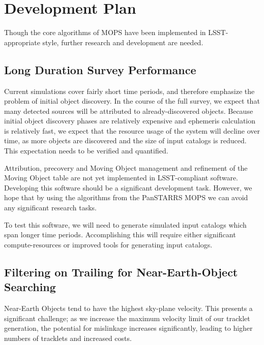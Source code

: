 \documentclass[12pt,preprint]{aastex}
\begin{document}
\section{Development Plan}

Though the core algorithms of MOPS have been implemented in
LSST-appropriate style, further research and development are needed.



\subsection{Long Duration Survey Performance}

Current simulations cover fairly short time periods, and therefore
emphasize the problem of initial object discovery.  In the course of
the full survey, we expect that many detected sources will be
attributed to already-discovered objects.  Because initial object
discovery phases are relatively expensive and ephemeris calculation is
relatively fast, we expect that the resource usage of the system will
decline over time, as more objects are discovered and the size of
input catalogs is reduced.  This expectation needs to be verified and
quantified.

Attribution, precovery and Moving Object management and refinement of the
Moving Object table are not yet implemented in LSST-compliant software.
Developing this software should be a significant development task.
However, we hope that by using the algorithms from the PanSTARRS MOPS
we can avoid any significant research tasks.

To test this software, we will need to generate simulated input
catalogs which span longer time periods.  Accomplishing this will
require either significant compute-resources or improved tools for
generating input catalogs.



\subsection{Filtering on Trailing for Near-Earth-Object Searching}

\label{neosTrailing}

Near-Earth Objects tend to have the highest sky-plane velocity.  This
presents a significant challenge; as we increase the maximum velocity
limit of our tracklet generation, the potential for mislinkage
increases significantly, leading to higher numbers of tracklets and
increased costs.  
\end{document}
